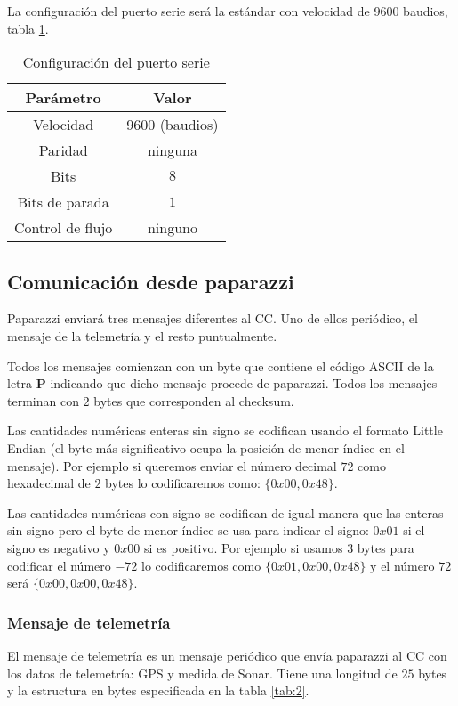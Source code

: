 La configuración del puerto serie será la estándar con velocidad de $9600$ baudios, tabla \ref{tab:1}.
\begin{table}[h]
	\centering
	\caption{Configuración del puerto serie}
\begin{tabular}{|c|c|}
	\hline
	\textbf{Parámetro} & \textbf{Valor} \\ \hline \hline
	Velocidad  & $9600$ (baudios) \\\hline 
	Paridad & ninguna  \\ \hline
	Bits & $8$ \\ \hline 
	Bits de parada & $1$  \\ \hline
	Control de flujo & ninguno \\ \hline
\end{tabular}
\label{tab:1}
\end{table}


\subsection{Comunicación desde paparazzi}

Paparazzi enviará tres mensajes diferentes al CC. Uno de ellos periódico, el mensaje de la telemetría y el resto puntualmente.

Todos los mensajes comienzan con un byte que contiene el código ASCII de la letra \textbf{P} indicando que dicho mensaje procede de paparazzi. Todos los mensajes terminan con $2$ bytes que corresponden al checksum.

Las cantidades numéricas enteras sin signo se codifican usando el formato Little Endian (el byte más significativo ocupa la posición de menor índice en el mensaje). Por ejemplo si queremos enviar el número decimal $72$ como hexadecimal de $2$ bytes lo codificaremos como: $\{0x00,0x48\}$.

Las cantidades numéricas con signo se codifican de igual manera que las enteras sin signo pero el byte de menor índice se usa para indicar el signo: $0x01$ si el signo es negativo y $0x00$ si es positivo. Por ejemplo si usamos $3$ bytes para codificar el número $-72$ lo codificaremos como $\{0x01,0x00,0x48\}$ y el número $72$ será $\{0x00,0x00,0x48\}$.

\subsubsection{Mensaje de telemetría}

El mensaje de telemetría es un mensaje periódico que envía paparazzi al CC con los datos de telemetría: GPS y medida de Sonar. Tiene una longitud de $25$ bytes y la estructura en bytes especificada en la tabla \ref{tab:2}.


